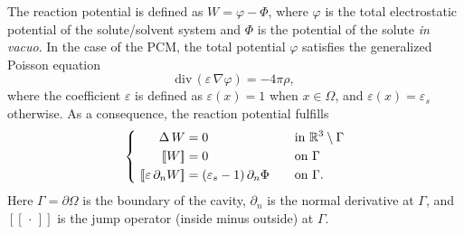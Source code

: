 The reaction potential is defined as $W = \varphi - \Phi$, where $\varphi$ is the total electrostatic potential of the solute/solvent system and $\Phi$ is the potential of the solute \emph{in vacuo}. In the case of the PCM, the total potential $\varphi$ satisfies the generalized Poisson equation\cite{Mennucci_JCP_IEF1,Mennucci_JMC_IEF2}
\begin{equation}
 \label{eq:genpoisson}
\text{div} \, (\varepsilon \, \nabla \varphi) = -4\pi \rho,
\end{equation}
where the coefficient $\varepsilon$ is defined as $\varepsilon(x) = 1$ when $x \in \Omega$, and $\varepsilon(x) = \varepsilon_s$ otherwise. As a consequence, the reaction potential fulfills
\begin{equation} 
\label{eq:pcmpde}
\left \{ 
\begin{alignedat}{4}
\Delta \,  W &= 0  &&\mbox{in } \mathbb{R}^3\setminus \Gamma  \\
 \ [\![W]\!] &= 0  &&\mbox{on } \Gamma\\
\  [\![\varepsilon \, \partial_n W]\!] &= (\varepsilon_s-1)\, \partial_n \Phi &\qquad& \mbox{on } \Gamma.
\end{alignedat} 
\right.
\end{equation}
Here $\Gamma=\partial\Omega$ is the boundary of the cavity, $\partial_n$ is the normal derivative at $\Gamma$, and $[\![\,\cdot\,]\!]$ is the jump operator (inside minus outside) at $\Gamma$.

